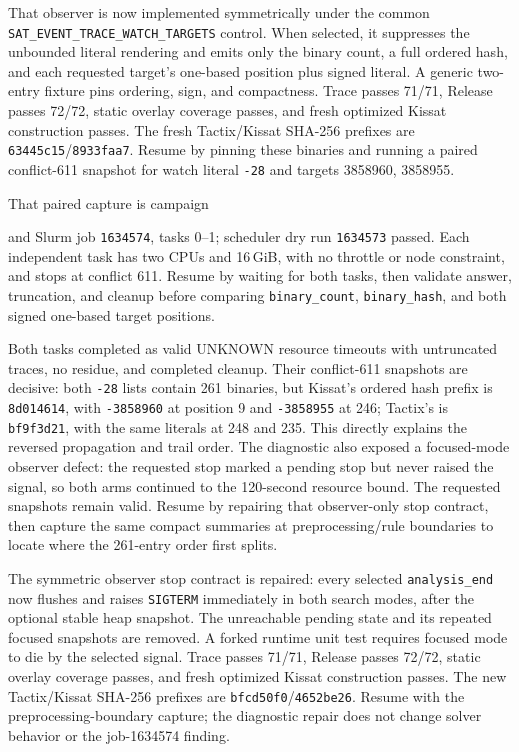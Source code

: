 \documentclass[11pt]{article}
\newcommand{\code}[1]{\texttt{#1}}
\newcommand{\artifact}[1]{\path{#1}}
\begin{document}
That observer is now implemented symmetrically under the common
\code{SAT\_EVENT\_TRACE\_WATCH\_TARGETS} control. When selected, it suppresses
the unbounded literal rendering and emits only the binary count, a full ordered
hash, and each requested target's one-based position plus signed literal. A
generic two-entry fixture pins ordering, sign, and compactness. Trace passes
71/71, Release passes 72/72, static overlay coverage passes, and fresh optimized
Kissat construction passes. The fresh Tactix/Kissat SHA-256 prefixes are
\code{63445c15}/\code{8933faa7}. Resume by pinning these binaries and running a
paired conflict-611 snapshot for watch literal \code{-28} and targets 3858960,
3858955.

That paired capture is campaign
\begin{center}\small\artifact{20260819-0942-tierd-rank22-watch-positions}\end{center}
and Slurm job \code{1634574}, tasks 0--1; scheduler dry run \code{1634573}
passed. Each independent task has two CPUs and 16\,GiB, with no throttle or node
constraint, and stops at conflict 611. Resume by waiting for both tasks, then
validate answer, truncation, and cleanup before comparing \code{binary\_count},
\code{binary\_hash}, and both signed one-based target positions.

Both tasks completed as valid UNKNOWN resource timeouts with untruncated traces,
no residue, and completed cleanup. Their conflict-611 snapshots are decisive:
both \code{-28} lists contain 261 binaries, but Kissat's ordered hash prefix is
\code{8d014614}, with \code{-3858960} at position 9 and \code{-3858955} at
246; Tactix's is \code{bf9f3d21}, with the same literals at 248 and 235. This
directly explains the reversed propagation and trail order. The diagnostic also
exposed a focused-mode observer defect: the requested stop marked a pending
stop but never raised the signal, so both arms continued to the 120-second
resource bound. The requested snapshots remain valid. Resume by repairing that
observer-only stop contract, then capture the same compact summaries at
preprocessing/rule boundaries to locate where the 261-entry order first splits.

The symmetric observer stop contract is repaired: every selected
\code{analysis\_end} now flushes and raises \code{SIGTERM} immediately in both
search modes, after the optional stable heap snapshot. The unreachable pending
state and its repeated focused snapshots are removed. A forked runtime unit
test requires focused mode to die by the selected signal. Trace passes 71/71,
Release passes 72/72, static overlay coverage passes, and fresh optimized Kissat
construction passes. The new Tactix/Kissat SHA-256 prefixes are
\code{bfcd50f0}/\code{4652be26}. Resume with the preprocessing-boundary capture;
the diagnostic repair does not change solver behavior or the job-1634574
finding.
\end{document}
